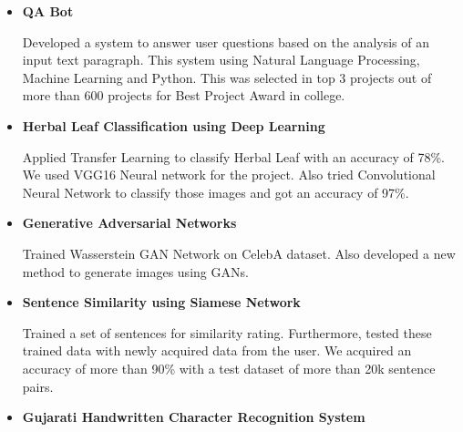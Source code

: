 \documentclass[11pt,a4paper,sans]{moderncv}        %
\begin{document}
\vspace{3pt}



\begin{itemize}

\item{\textbf{QA Bot}

\vspace{2pt}

\small{Developed a system to answer user questions based on the analysis of an input text paragraph. This system using Natural Language Processing, Machine Learning and Python. This was selected in top 3 projects out of more than 600 projects for Best Project Award in college.}}
\vspace{3pt}

\item{\textbf{Herbal Leaf Classification using Deep Learning} 

\vspace{2pt}

\small{Applied Transfer Learning to classify Herbal Leaf with an accuracy of 78\%. We used VGG16 Neural network for the project. Also tried Convolutional Neural Network to classify those images and got an accuracy of 97\%.}}

\vspace{3pt}

\item{\textbf{Generative Adversarial Networks} 

\vspace{2pt}

\small{Trained Wasserstein GAN Network on CelebA dataset. Also developed a new method to generate images using GANs.}}

\vspace{3pt}

\item{\textbf{Sentence Similarity using Siamese Network} 

\vspace{2pt}

\small{Trained a set of sentences for similarity rating. Furthermore, tested these trained data with newly acquired data from the user. We acquired an accuracy of more than 90\% with a test dataset of more than 20k sentence pairs.}}

\vspace{3pt}

\item{\textbf{Gujarati Handwritten Character Recognition System} 

}
\end{itemize}
\end{document}
